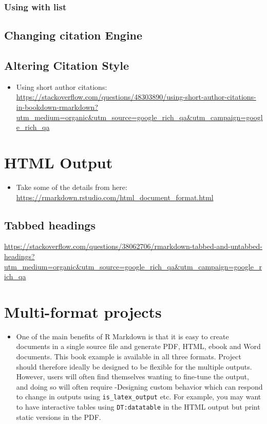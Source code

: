 \documentclass[]{book}
\providecommand{\tightlist}{%
  \setlength{\itemsep}{0pt}\setlength{\parskip}{0pt}}
\theoremstyle{definition}
\theoremstyle{definition}
\theoremstyle{definition}
\theoremstyle{remark}
\begin{document}
\subsection{Using with list}\label{using-with-list}

\section{Changing citation Engine}\label{changing-citation-engine}

\section{Altering Citation Style}\label{altering-citation-style}

\begin{itemize}
\tightlist
\item
  Using short author citations:
  \url{https://stackoverflow.com/questions/48303890/using-short-author-citations-in-bookdown-rmarkdown?utm_medium=organic\&utm_source=google_rich_qa\&utm_campaign=google_rich_qa}
\end{itemize}

\chapter{HTML Output}\label{html-output}

\begin{itemize}
\tightlist
\item
  Take some of the details from here:
  \url{https://rmarkdown.rstudio.com/html_document_format.html}
\end{itemize}

\section{Tabbed headings}\label{tabbed-headings}

\url{https://stackoverflow.com/questions/38062706/rmarkdown-tabbed-and-untabbed-headings?utm_medium=organic\&utm_source=google_rich_qa\&utm_campaign=google_rich_qa}

\chapter{Multi-format projects}\label{multi-format-projects}

\begin{itemize}
\tightlist
\item
  One of the main benefits of R Markdown is that it is easy to create
  documents in a single source file and generate PDF, HTML, ebook and
  Word documents. This book example is available in all three formats.
  Project should therefore ideally be designed to be flexible for the
  multiple outputs. However, users will often find themselves wanting to
  fine-tune the output, and doing so will often require -Designing
  custom behavior which can respond to change in outputs using
  \texttt{is\_latex\_output} etc. For example, you may want to have
  interactive tables using \texttt{DT:datatable} in the HTML output but
  print static versions in the PDF.
\end{itemize}
\end{document}
